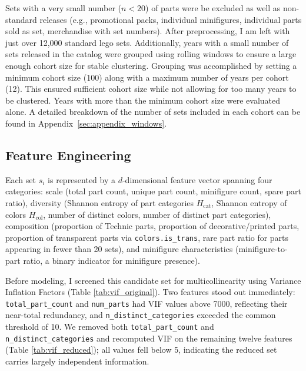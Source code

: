 \documentclass[11pt, letterpaper]{article}
\begin{document}
Sets with a very small number ($n < 20$) of parts were be excluded as well as non-standard releases (e.g., promotional packs, individual minifigures, individual parts sold as set, merchandise with set numbers). After preprocessing, I am left with just over 12,000 standard lego sets. Additionally, years with a small number of sets released in the catalog were grouped using rolling windows to ensure a large enough cohort size for stable clustering. Grouping was accomplished by setting a minimum cohort size (100) along with a maximum number of years per cohort (12). This ensured sufficient cohort size while not allowing for too many years to be clustered. Years with more than the minimum cohort size were evaluated alone. A detailed breakdown of the number of sets included in each cohort can be found in Appendix~\ref{sec:appendix_windows}.

\subsection{Feature Engineering}

Each set $s_i$ is represented by a $d$-dimensional feature vector spanning four categories: scale (total part count, unique part count, minifigure count, spare part ratio), diversity (Shannon entropy of part categories $H_\text{cat}$, Shannon entropy of colors $H_\text{col}$, number of distinct colors, number of distinct part categories), composition (proportion of Technic parts, proportion of decorative/printed parts, proportion of transparent parts via \texttt{colors.is\_trans}, rare part ratio for parts appearing in fewer than 20 sets), and minifigure characteristics (minifigure-to-part ratio, a binary indicator for minifigure presence).

Before modeling, I screened this candidate set for multicollinearity using Variance Inflation Factors (Table \ref{tab:vif_original}). Two features stood out immediately: \texttt{total\_part\_count} and \texttt{num\_parts} had VIF values above 7000, reflecting their near-total redundancy, and \texttt{n\_distinct\_categories} exceeded the common threshold of 10. We removed both \texttt{total\_part\_count} and \texttt{n\_distinct\_categories} and recomputed VIF on the remaining twelve features (Table \ref{tab:vif_reduced}); all values fell below 5, indicating the reduced set carries largely independent information.
\end{document}
